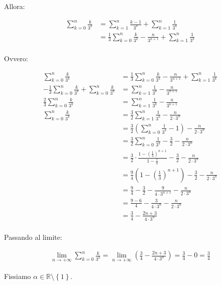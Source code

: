 \documentclass{article}
\newcommand*{\oo}{\infty}
\newcommand*{\limit}[2]{\lim_{#1\rightarrow#2}}
\begin{document}
Allora:


\[\begin{aligned}
    \sum_{k=0}^{n}\frac{k}{3^k}
    &= \sum_{k=1}^{n}\frac{k-1}{3^k} + \sum_{k=1}^{n}\frac{1}{3^k} \\
    &= \frac{1}{3}\sum_{k=0}^{n}\frac{k}{3^k} - \frac{n}{3^{n+1}} + \sum_{k=1}^{n}\frac{1}{3^k} \\
\end{aligned}\]

Ovvero:

\[\begin{aligned}
    \sum_{k=0}^{n}\frac{k}{3^k}
    &= \frac{1}{3}\sum_{k=0}^{n}\frac{k}{3^k} - \frac{n}{3^{n+1}} + \sum_{k=1}^{n}\frac{1}{3^k} \\
    - \frac{1}{3}\sum_{k=0}^{n}\frac{k}{3^k} + \sum_{k=0}^{n}\frac{k}{3^k}
    &= \sum_{k=1}^{n}\frac{1}{3^k} - \frac{n}{3^{n+1}} \\
    \frac{2}{3}\sum_{k=0}^{n}\frac{k}{3^k}
    &= \sum_{k=1}^{n}\frac{1}{3^k} - \frac{n}{3^{n+1}} \\
    \sum_{k=0}^{n}\frac{k}{3^k}
    &= \frac{3}{2}\sum_{k=1}^{n}\frac{1}{3^k} - \frac{n}{2\cdot3^{n}} \\
    &= \frac{3}{2}\left(\sum_{k=0}^{n}\frac{1}{3^k} - 1\right) - \frac{n}{2\cdot3^{n}} \\
    &= \frac{3}{2}\sum_{k=0}^{n}\frac{1}{3^k} - \frac{3}{2} - \frac{n}{2\cdot3^{n}} \\
    &= \frac{3}{2}\cdot\frac{1-\left(\frac{1}{3}\right)^{n+1}}{1-\frac{1}{3}} - \frac{3}{2} - \frac{n}{2\cdot3^{n}} \\
    &= \frac{9}{4}\left(1-\left(\frac{1}{3}\right)^{n+1}\right) - \frac{3}{2} - \frac{n}{2\cdot3^{n}} \\
    &= \frac{9}{4} - \frac{3}{2} - \frac{9}{4\cdot3^{n+1}} - \frac{n}{2\cdot3^{n}} \\
    &= \frac{9-6}{4} - \frac{3}{4\cdot3^n} - \frac{n}{2\cdot3^n} \\
    &= \frac{3}{4} - \frac{2n+3}{4\cdot3^n} \\
\end{aligned}\]

Passando al limite:

\[\begin{aligned}
    \limit{n}{+\oo}\sum_{k=0}^{n}\frac{k}{3^k}
    = \limit{n}{+\oo}\left(\frac{3}{4} - \frac{2n+3}{4\cdot3^n}\right)
    = \frac{3}{4} - 0
    = \frac{3}{4}
\end{aligned}\]

\pagebreak
Fissiamo $\alpha\in\mathbb{R}\setminus\left\{1\right\}$.
\end{document}
